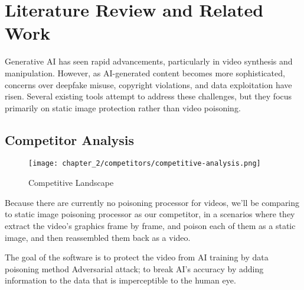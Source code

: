 \chapter{Literature Review and Related Work}
\label{chap:relatedworks}

Generative AI has seen rapid advancements, particularly in video synthesis and manipulation. 
However, as AI-generated content becomes more sophisticated, concerns over deepfake misuse, copyright violations, 
and data exploitation have risen. Several existing tools attempt to address these challenges, 
but they focus primarily on static image protection rather than video poisoning.

\clearpage

\section{Competitor Analysis}
\label{section:competitor-analysis}

\begin{figure}[h]
    \centering
    \texttt{[image: chapter\_2/competitors/competitive-analysis.png]}
    \caption{Competitive Landscape}

\end{figure}

Because there are currently no poisoning processor for videos, we'll be comparing to static image poisoning processor as our competitor, in a scenarios where they extract the video's graphics frame by frame, and poison each of them as a static image, and then reassembled them back as a video.

    The goal of the software is to protect the video from AI training by data poisoning method Adversarial attack; to break AI's accuracy by adding information to the data that is imperceptible to the human eye.

    \clearpage

